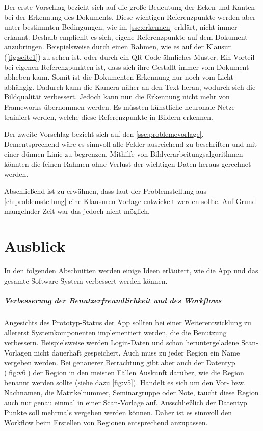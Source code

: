 \documentclass[notables, nomenclature, oneside, 150]{HSMW-Thesis}
\begin{document}
		Der erste Vorschlag bezieht sich auf die große Bedeutung der Ecken und Kanten bei der Erkennung des Dokuments. Diese wichtigen Referenzpunkte werden aber unter bestimmten Bedingungen, wie im \autoref{ssc:erkennen} erklärt, nicht immer erkannt. Deshalb empfiehlt es sich, eigene Referenzpunkte auf dem Dokument anzubringen. Beispielsweise durch einen Rahmen, wie es auf der Klausur (\ref{fig:seite1}) zu sehen ist. oder durch ein QR-Code ähnliches Muster. Ein Vorteil bei eigenen Referenzpunkten ist, dass sich ihre Gestallt immer vom Dokument abheben kann. Somit ist die Dokumenten-Erkennung nur noch vom Licht abhängig. Dadurch kann die Kamera näher an den Text heran, wodurch sich die Bildqualität verbessert. Jedoch kann nun die Erkennung nicht mehr von Frameworks übernommen werden. Es müssten künstliche neuronale Netze trainiert werden, welche diese Referenzpunkte in Bildern erkennen. 
	
		Der zweite Vorschlag bezieht sich auf den \autoref{ssc:problemevorlage}. Dementsprechend wäre es sinnvoll alle Felder ausreichend zu beschriften und mit einer dünnen Linie zu begrenzen. Mithilfe von Bildverarbeitungsalgorithmen könnten die feinen Rahmen ohne Verlust der wichtigen Daten heraus gerechnet werden.
		
		Abschließend ist zu erwähnen, dass laut der Problemstellung aus \autoref{ch:problemstellung} eine Klausuren-Vorlage entwickelt werden sollte. Auf Grund mangelnder Zeit war das jedoch nicht möglich.

		
\chapter{Ausblick}\label{ch:ausblick}
	In den folgenden Abschnitten werden einige Ideen erläutert, wie die App und das gesamte Software-System verbessert werden können.
	
	\paragraph*{Verbesserung der Benutzerfreundlichkeit und des Workflows} \label{pa:benutzer} 
		Angesichts des Prototyp-Status der App sollten bei einer Weiterentwicklung zu allererst Systemkomponenten implementiert werden, die die Benutzung verbessern. Beispielsweise werden Login-Daten und schon heruntergeladene Scan-Vorlagen nicht dauerhaft gespeichert. Auch muss zu jeder Region ein Name vergeben werden. Bei genauerer Betrachtung gibt aber auch der Datentyp (\ref{fig:v6}) der Region in den meisten Fällen Auskunft darüber, wie die Region benannt werden sollte (siehe dazu \autoref{fig:v5}). Handelt es sich um den Vor- bzw. Nachnamen, die Matrikelnummer, Seminargruppe oder Note, taucht diese Region auch nur genau einmal in einer Scan-Vorlage auf. Ausschließlich der Datentyp Punkte soll mehrmals vergeben werden können. Daher ist es sinnvoll den Workflow beim Erstellen von Regionen entsprechend anzupassen. 
	
\end{document}
